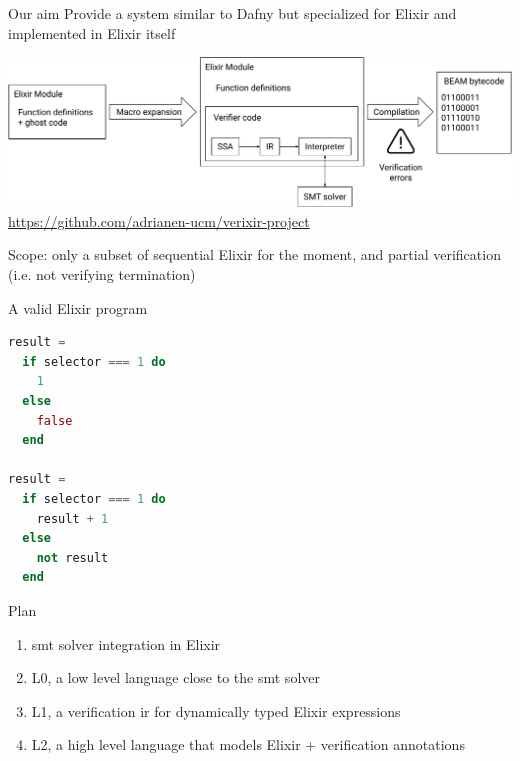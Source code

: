\documentclass{beamer}
\begin{document}
  \begin{frame}{Our aim}
    Provide a system similar to Dafny but specialized for Elixir
    and implemented in Elixir itself

    \pause \bigskip

    \begin{center}
      \includegraphics[width=\textwidth]{Images/Vectorial/Diagram.pdf}
      \url{https://github.com/adrianen-ucm/verixir-project}
    \end{center}
    
    \pause \bigskip

    Scope: only a subset of sequential Elixir for the moment, and partial 
    verification (i.e. not verifying termination)
  \end{frame}
  \begin{frame}[fragile]{A valid Elixir program}
    \small
    \begin{lstlisting}[language=elixir,numbers=none,frame=none]
result =
  if selector === 1 do
    1
  else
    false
  end

result =
  if selector === 1 do
    result + 1
  else
    not result
  end
    \end{lstlisting}
  \end{frame}
  \begin{frame}{Plan}
    \begin{enumerate}
      \item \pause \acrshort*{smt} solver integration in Elixir
      \item \pause L0, a low level language close to the \acrshort*{smt} solver
      \item \pause L1, a verification \gls*{ir} for dynamically typed Elixir expressions
      \item \pause L2, a high level language that models Elixir + verification annotations
    \end{enumerate}
  \end{frame}
\end{document}
